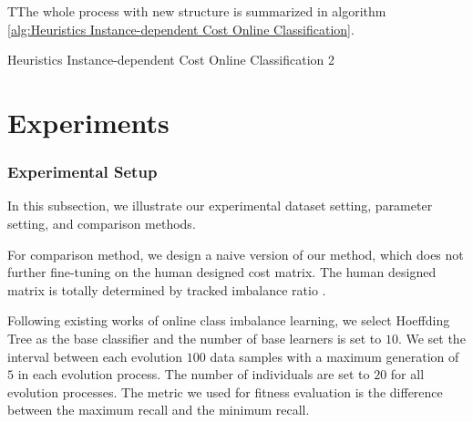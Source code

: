 \documentclass{article}
\begin{document}
TThe whole process with new structure is summarized in algorithm \ref{alg:Heuristics Instance-dependent Cost Online Classification}.

\begin{algorithm}
	\caption{Heuristics Instance-dependent Cost Online Classification 2}
\label{alg:Heuristics Instance-dependent Cost Online Classification}
\end{algorithm}



\section{Experiments}
\subsubsection{Experimental Setup}
In this subsection, we illustrate our experimental dataset setting, parameter setting, and comparison methods.

For comparison method, we design a naive version of our method, which does not further fine-tuning on the human designed cost matrix. The human designed matrix is totally determined by tracked imbalance ratio .

Following existing works of online class imbalance learning, we select Hoeffding Tree  as the base classifier and the number of base learners is set to $10$. We set the interval between each evolution $100$ data samples with a maximum generation of $5$ in each evolution process. The number of individuals are set to $20$ for all evolution processes. The metric we used for fitness evaluation is the difference between the maximum recall and the minimum recall.
\end{document}
